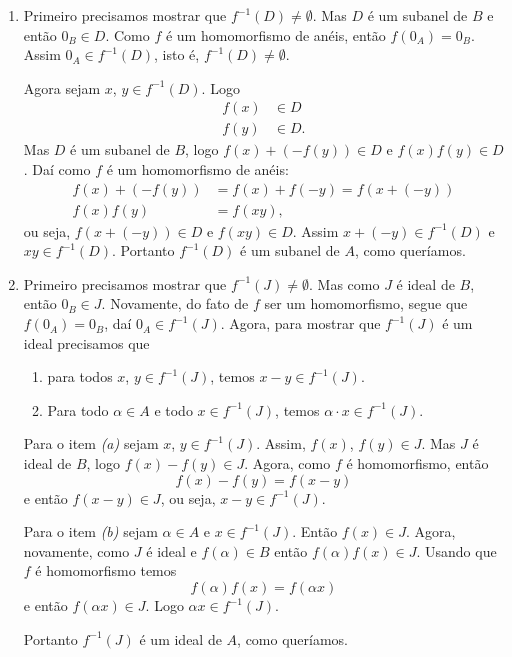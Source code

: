 \documentclass[12pt]{exam}
\begin{document}
	\begin{enumerate}[label={\roman*})]
		\item Primeiro precisamos mostrar que $f^{-1}(D) \ne \emptyset$. Mas $D$ é um subanel de $B$ e então $0_B \in D$. Como $f$ é um homomorfismo de anéis, então $f(0_A) = 0_B$. Assim $0_A \in f^{-1}(D)$, isto é, $f^{-1}(D) \ne \emptyset$.

		Agora sejam $x$, $y \in f^{-1}(D)$. Logo
		\begin{align*}
			f(x) &\in D\\
			f(y) &\in D.
		\end{align*}
		Mas $D$ é um subanel de $B$, logo $f(x) + (-f(y)) \in D$ e $f(x)f(y) \in D$. Daí como $f$ é um homomorfismo de anéis:
		\begin{align*}
			f(x) + (-f(y)) &= f(x) + f(-y) = f(x + (-y))\\
			f(x)f(y) &= f(xy),
		\end{align*}
		ou seja, $f(x + (-y)) \in D$ e $f(xy) \in D$. Assim $x + (-y) \in f^{-1}(D)$ e $xy \in f^{-1}(D)$. Portanto $f^{-1}(D)$ é um subanel de $A$, como queríamos.

		\item Primeiro precisamos mostrar que $f^{-1}(J) \ne \emptyset$. Mas como $J$ é ideal de $B$, então $0_B \in J$. Novamente, do fato de $f$ ser um homomorfismo, segue que $f(0_A) = 0_B$, daí $0_A \in f^{-1}(J)$. Agora, para mostrar que $f^{-1}(J)$ é um ideal precisamos que
		\begin{enumerate}
			\item para todos $x$, $y \in f^{-1}(J)$, temos $x - y \in f^{-1}(J)$.
			\item Para todo $\alpha \in A$ e todo $x \in f^{-1}(J)$, temos $\alpha\cdot x \in f^{-1}(J)$.
		\end{enumerate}

		Para o item \textit{(a)} sejam $x$, $y \in f^{-1}(J)$. Assim, $f(x)$, $f(y) \in J$. Mas $J$ é ideal de $B$, logo $f(x) - f(y) \in J$. Agora, como $f$ é homomorfismo, então
		\[
			f(x) - f(y) = f(x - y)
		\]
		e então $f(x - y) \in J$, ou seja, $x - y \in f^{-1}(J)$.

		Para o item \textit{(b)} sejam $\alpha \in A$ e $x \in f^{-1}(J)$. Então $f(x) \in J$. Agora, novamente, como $J$ é ideal e $f(\alpha) \in B$ então $f(\alpha)f(x) \in J$. Usando que $f$ é homomorfismo temos
		\[
			f(\alpha)f(x) = f(\alpha x)
		\]
		e então $f(\alpha x) \in J$. Logo $\alpha x \in f^{-1}(J)$.

		Portanto $f^{-1}(J)$ é um ideal	 de $A$, como queríamos.
	\end{enumerate}
\end{document}
